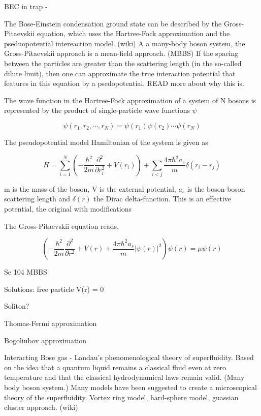 BEC in trap - 

The Bose-Einstein condensation ground state can be described by the Gross-Pitaevskii equation, which uses the Hartree-Fock approximation and the pseduopotential intereaction model. (wiki) 
A a many-body boson system, the Gross-Pitaevskii approach is a mean-field approach. (MBBS)
If the spacing between the particles are greater than the scattering length (in the so-called dilute limit), then one can approximate the true interaction potential that features in this equation by a psedopotential. READ more about why this is.

The wave function in the Hartree-Fock approximation of a system of N bosons is represented by the product of single-particle wave functions $\psi$

\begin{equation}
\psi(r_1, r_2, \cdots, r_N) = \psi(r_1) \psi(r_2) \cdots \psi(r_N)
\end{equation}

The pseudopotential model Hamiltonian of the system is given as 

\begin{equation}
H = \sum_{i=1}^N \left( -\frac{\hbar^2}{2m} \frac{\partial^2}{\partial r_i^2} + V(r_i) \right) + \sum_{i<j} \frac{4 \pi \hbar^2 a_s}{m} \delta (r_i - r_j)
\end{equation}

m is the mass of the boson, V is the external potential, $a_s$ is the boson-boson scattering length and $\delta(r)$ the Dirac delta-function. This is an effective potential, the original  with modifications 

The Gross-Pitaevskii equation reads, 

\begin{equation}
\left( -\frac{\hbar^2}{2m} \frac{\partial^2}{\partial r^2} + V(r) + \frac{4 \pi \hbar^2 a_s}{m}|\psi(r)|^2 \right) \psi(r) = \mu \psi (r)
\end{equation}

Se 104 MBBS

Solutions: free particle V(r) = 0

Soliton?

Thomas-Fermi approximation

Bogoliubov approximation

Interacting Bose gas - Landau's phenomenological theory of superfluidity. Based on the idea that a quantum liquid remains a classical fluid even at zero temperature  and that the classical hydrodynamical laws remain valid. (Many body boson system.) 
Many models have been suggested to create a microscopical theory of the superfluidity. Vortex ring model, hard-sphere model, guassian cluster approach. (wiki)

